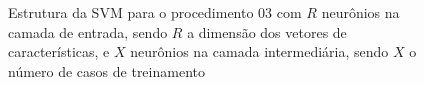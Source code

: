 \begin{figure}
	\centering
	\scalebox{2}{
		
	}
	\caption{Estrutura da SVM para o procedimento 03 com $R$ neurônios na camada de entrada, sendo $R$ a dimensão dos vetores de características, e $X$ neurônios na camada intermediária, sendo $X$ o número de casos de treinamento}
	\label{fig:3layersSVM}
\end{figure} 